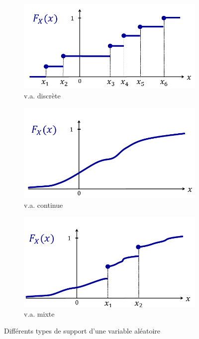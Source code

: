 \documentclass[11pt,a4paper]{article}
\numberwithin{equation}{section}
\begin{document}
\begin{figure}
	\center
	\begin{subfigure}{0.3\textwidth}
		\centering
		\includegraphics[scale=0.3]{images/va_discrete}
		\caption{v.a. discrète}
		\label{subfig_va_discrete}
	\end{subfigure}
		\begin{subfigure}{0.3\textwidth}
		\centering
		\includegraphics[scale=0.3]{images/va_continue}
		\caption{v.a. continue}
		\label{subfig_va_continue}
	\end{subfigure}
		\begin{subfigure}{0.3\textwidth}
		\centering
		\includegraphics[scale=0.3]{images/va_mixte}
		\caption{v.a. mixte}
		\label{subfig_va_mixte}
	\end{subfigure}
	\caption{Différents types de support d'une variable aléatoire}
	\label{fig_type_support}
\end{figure}
\end{document}
